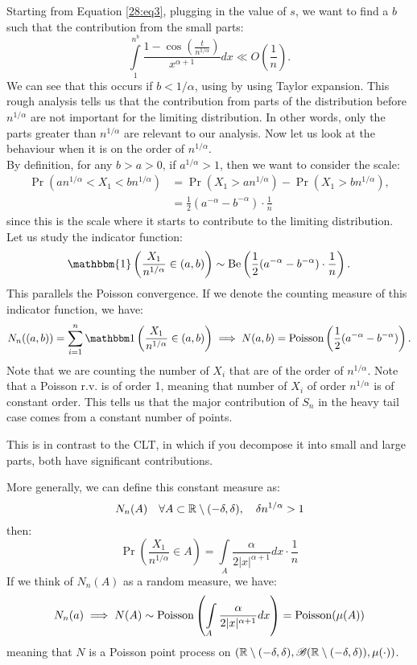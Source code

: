 \documentclass[../main/main.tex]{subfiles}
\begin{document}
Starting from Equation \ref{28:eq3}, plugging in the value of $s$, we want to find a $b$ such that the contribution from the small parts: \[
	\int\limits_{1}^{n^{b}} \frac{1-\cos(\frac{t}{n^{1 / \alpha}})}{x^{\alpha + 1}}dx \ll O\left(\frac{1}{n}\right).
\] We can see that this occurs if $b < 1 / \alpha$, using by using Taylor expansion. This rough analysis tells us that the contribution from parts of the distribution before $n^{1 / \alpha}$ are not important for the limiting distribution. In other words, only the parts greater than $n^{1 / \alpha}$ are relevant to our analysis. Now let us look at the behaviour when it is on the order of $n^{1 / \alpha}$. \\

By definition, for any $b > a > 0$, if $a ^{1 / \alpha} > 1$, then we want to consider the scale:
\begin{align*}
	\Pr(an^{1 / \alpha}< X_1 < bn^{1 / \alpha}) & = \Pr(X_1 > an^{1 / \alpha}) - \Pr(X_1 > bn^{1 / \alpha}), \\
	                                            & = \frac{1}{2}(a^{-\alpha}-b^{-\alpha}) \cdot \frac{1}{n}
\end{align*}
since this is the scale where it starts to contribute to the limiting distribution. Let us study the indicator function: \[
	\mathbbm{1}\left( \frac{X_1}{n^{1 / \alpha}} \in (a,b) \right) \sim \Be \left( \frac{1}{2}(a^{-\alpha}-b^{-\alpha}) \cdot \frac{1}{n} \right).
\] This parallels the Poisson convergence. If we denote the counting measure of this indicator function, we have: \[
	N_n((a,b)) = \sum\limits_{i=1}^{n}\ind\left( \frac{X_1}{n^{1 / \alpha}} \in (a,b) \right)  \implies N(a,b) = \Poi \left( \frac{1}{2}(a^{-\alpha}-b^{-\alpha}) \right).
\]
Note that we are counting the number of $X_i$ that are of the order of $n^{1 / \alpha}$. Note that a Poisson r.v. is of order 1, meaning that number of $X_i$ of order $n^{1 / \alpha}$ is of constant order. This tells us that the major contribution of $S_n$ in the heavy tail case comes from a constant number of points.
\begin{remark}
	This is in contrast to the CLT, in which if you decompose it into small and large parts, both have significant contributions.
\end{remark}
More generally, we can define this constant measure as: \[
	N_n(A) \quad \forall A \subset \mathbb{R} \setminus (-\delta , \delta),\quad \delta n^{1 / \alpha} > 1
\] then: \[
	\Pr \left( \frac{X_1}{n^{1 / \alpha}}\in A \right) = \int\limits_{A} \frac{\alpha}{2 |x|^{\alpha+1}}dx \cdot \frac{1}{n}
\] If we think of $N_n(A)$ as a random measure, we have: \[
	N_n(a) \implies N(A) \sim \text{Poisson} \left(
	\int\limits_{A} \frac{\alpha}{2 |x|^{\alpha+1}}dx
	\right) = \text{Poisson}(\mu(A))
\]
meaning that $N$ is a Poisson point process on $(\mathbb{R} \setminus (-\delta,\delta),\mathscr{B}(\mathbb{R} \setminus (-\delta,\delta)), \mu( \cdot))$.\\
\end{document}
